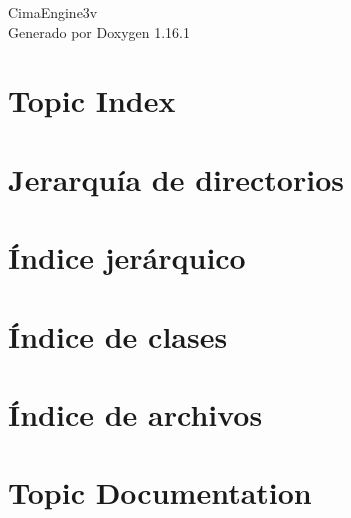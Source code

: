 \documentclass[twoside]{book}
\newcommand{\+}{\discretionary{\mbox{\scriptsize$\hookleftarrow$}}{}{}}
\newcommand{\clearemptydoublepage}{%
    \newpage{\pagestyle{empty}\cleardoublepage}%
  }
\begin{document}
  \raggedbottom
    \hypersetup{pageanchor=false,
                bookmarksnumbered=true,
                pdfencoding=unicode
               }
  \begin{titlepage}
  \vspace*{7cm}
  \begin{center}%
  {\Large Cima\+Engine3v}\\
  \vspace*{1cm}
  {\large Generado por Doxygen 1.16.1}\\
  \end{center}
  \end{titlepage}
  \clearemptydoublepage
  \tableofcontents
  \clearemptydoublepage
  \hypersetup{pageanchor=true}






\chapter{Topic Index}

\chapter{Jerarquía de directorios}

\chapter{Índice jerárquico}

\chapter{Índice de clases}

\chapter{Índice de archivos}

\chapter{Topic Documentation}







\end{document}
